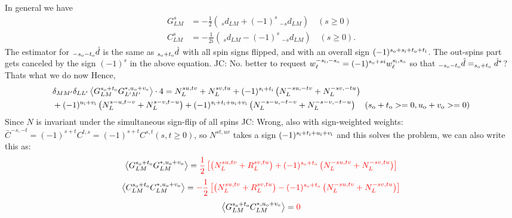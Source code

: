 \documentclass{article}
\newcommand{\si}[0]{{s_{\rm i}}}
\newcommand{\ti}[0]{{t_{\rm i}}}
\newcommand{\ui}[0]{{u_{\rm i}}}
\newcommand{\vi}[0]{{v_{\rm i}}}
\newcommand{\so}[0]{{s_{\rm o}}}
\renewcommand{\to}[0]{{t_{\rm o}}}
\newcommand{\uo}[0]{{u_{\rm o}}}
\newcommand{\vo}[0]{{v_{\rm o}}}
\newcommand{\av}[1]{\left\langle #1 \right\rangle}
\newcommand{\red}[1]{\color{red}#1 \color{black} }
\newcommand{\JC}[1]{\color{red}JC: #1\color{black}}
\begin{document}
In general we have
\begin{eqnarray*}
		G^{s}_{LM} &= -\frac 12\left(\:_s d_{LM} + (-1)^s \:_{-s} d_{LM}\right) \quad (s \geq 0) \\
		C^{s}_{LM} &=-\frac 1{2i} \left( \:_s d_{LM} - (-1)^s \:_{-s} d_{LM} \right) \quad (s \geq 0).
\end{eqnarray*}
The estimator for $_{-\so - \to}\hat d$ is the same as $_{\so + \to}\hat d$ with all spin signs flipped, and with an overall sign $(-1)^{\so + \si + \to + \ti}$. The out-spins part gets canceled by the sign $(-1)^s$ in the above equation. \JC{No. better to request $w_\ell^{-\si, -\so} = (-1)^{\so + si}w_\ell^{\si,\so} $ so that $_{-\so - \to}\hat d = _{\so + \to}\hat d^*$? Thats what we do now}
Hence,
\begin{equation}
\begin{split}
			&\delta_{MM'}\delta_{LL'}\av{G^{\so + \to}_{LM} G^{*,\uo + \vo}_{L'M'} }\cdot 4 =N^{su, tv}_L + N^{sv, tu}_L + (-1)^{\si + \ti}\left(N^{-su, -tv}_L + N_L^{-sv, -tu} \right) \\&+ (-1)^{\ui + \vi}\left(N^{s-u, t-v}_L + N_L^{s-v, t-u}\right) + (-1)^{\si + \ti + \ui + \vi}\left(N^{-s-u, -t-v}_L + N_L^{-s-v, -t-u}\right)\quad (\so + \to >= 0, \uo + \vo >= 0)
\end{split}
\end{equation}
Since $N$ is invariant under the simultaneous sign-flip of all spins \JC{Wrong, also with sign-weighted weights: $\bar C^{-s, -t} = (-1)^{s + t}C^{t,s} =  (-1)^{s + t}C^{s,t} (s,t \geq 0)$, so $N^{st, uv}$ takes a sign $(-1)^{\si + \ti + \ui + \vi}$ and this solves the problem}, we can also write this as:
\begin{equation}
	\av{G^{\so + \to}_{LM} G^{*, \uo + \vo}_{L M} } = \red{\frac 12\left[ \left(N^{su, tv}_L  + R^{sv, tu}_L\right) + (-1)^{\so + \to} \left(N^{-su, tv}_L + N_L^{-sv, tu} \right) \right]}
\end{equation}
\begin{equation}
	\av{C^{\so + \to}_{LM} C^{*, \uo + \vo}_{L M} } =\red{- \frac 12\left[ \left(N^{su, tv}_L  + R^{sv, tu}_L\right)  - (-1)^{\so + \to} \left(N^{-su, tv}_L + N_L^{-sv, tu} \right) \right]}
\end{equation}
\begin{equation}
	\av{G^{\so + \to}_{LM} C^{*, \uo + \vo}_{L M} } =\red{0}
\end{equation}
\color{red}{Pfeew}\color{black}
\end{document}
